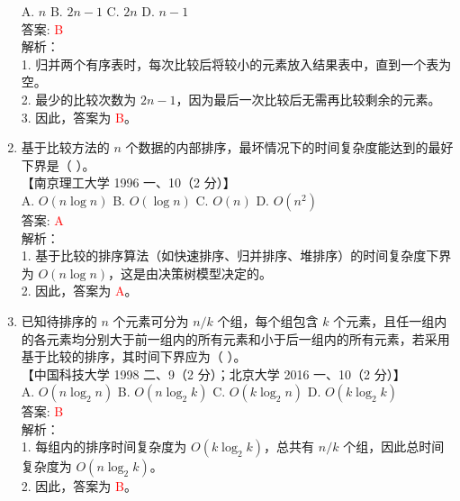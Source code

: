 \documentclass[lang=cn,newtx,10pt,scheme=chinese]{../../../elegantbook}
\begin{document}
\begin{enumerate}
    A. $n$ \quad B. $2n-1$ \quad C. $2n$ \quad D. $n-1$ \\  

    答案: \textcolor{red}{B} \\

    解析：\\
    1. 归并两个有序表时，每次比较后将较小的元素放入结果表中，直到一个表为空。\\
    2. 最少的比较次数为 $2n-1$，因为最后一次比较后无需再比较剩余的元素。\\
    3. 因此，答案为 \textcolor{red}{B}。\\

\item 基于比较方法的 $n$ 个数据的内部排序，最坏情况下的时间复杂度能达到的最好下界是（ ）。\\
    【南京理工大学 1996 一、10（2 分）】\\  

    A. $O(n \log n)$ \quad B. $O(\log n)$ \quad C. $O(n)$ \quad D. $O(n^2)$ \\  

    答案: \textcolor{red}{A} \\

    解析：\\
    1. 基于比较的排序算法（如快速排序、归并排序、堆排序）的时间复杂度下界为 $O(n \log n)$，这是由决策树模型决定的。\\
    2. 因此，答案为 \textcolor{red}{A}。\\

\item 已知待排序的 $n$ 个元素可分为 $n / k$ 个组，每个组包含 $k$ 个元素，且任一组内的各元素均分别大于前一组内的所有元素和小于后一组内的所有元素，若采用基于比较的排序，其时间下界应为（ ）。\\
    【中国科技大学 1998 二、9（2 分）；北京大学 2016 一、10（2 分）】\\  

    A. $O(n \log_2 n)$ \quad B. $O(n \log_2 k)$ \quad C. $O(k \log_2 n)$ \quad D. $O(k \log_2 k)$ \\  

    答案: \textcolor{red}{B} \\

    解析：\\
    1. 每组内的排序时间复杂度为 $O(k \log_2 k)$，总共有 $n / k$ 个组，因此总时间复杂度为 $O(n \log_2 k)$。\\
    2. 因此，答案为 \textcolor{red}{B}。\\


\end{enumerate}
\end{document}
